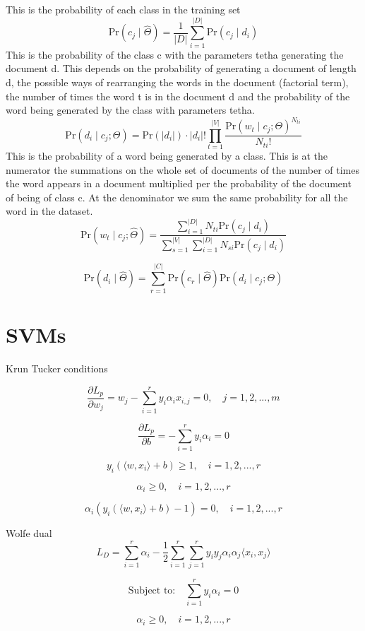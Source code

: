 \documentclass[12pt,oneside,a4paper]{article}
\begin{document}
This is the probability of each class in the training set
\[
    \text{Pr}(c_j \mid \hat{\Theta}) = \frac{1}{|D|} \sum_{i=1}^{|D|} \text{Pr}(c_j \mid d_i)
\]
This is the probability of the class c with the parameters tetha generating the document d. This depends on the probability of generating a document of length d, the possible ways of rearranging the words in the document (factorial term), the number of times the word t is in the document d and the probability of the word being generated by the class with parameters tetha.
\[
    \text{Pr}(d_i \mid c_j; \Theta) = \text{Pr}(|d_i|) \cdot |d_i|! \prod_{t=1}^{|V|} \frac{\text{Pr}(w_t \mid c_j; \Theta)^{N_{ti}}}{N_{ti}!}
\]
This is the probability of a word being generated by a class. This is at the numerator the summations on the whole set of documents of the number of times the word appears in a document multiplied per the probability of the document of being of class c.
At the denominator we sum the same probability for all the word in the dataset.
\[
    \text{Pr}(w_t \mid c_j; \hat{\Theta}) = \frac{\sum_{i=1}^{|D|} N_{ti} \text{Pr}(c_j \mid d_i)}{\sum_{s=1}^{|V|} \sum_{i=1}^{|D|} N_{si} \text{Pr}(c_j \mid d_i)}
\]

\[
    \text{Pr}(d_i \mid \hat{\Theta}) = \sum_{r=1}^{|C|} \text{Pr}(c_r \mid \hat{\Theta}) \text{Pr}(d_i \mid c_j; \Theta)
\]

\section{SVMs}
Krun Tucker conditions

\[
    \frac{\partial L_p}{\partial w_j} = w_j - \sum_{i=1}^{r} y_i \alpha_i x_{i,j} = 0, \quad j = 1, 2, ..., m
\]

\[
    \frac{\partial L_p}{\partial b} = - \sum_{i=1}^{r} y_i \alpha_i = 0
\]

\[
    y_i \left( \langle w, x_i \rangle + b \right) \geq 1, \quad i = 1, 2, ..., r
\]

\[
    \alpha_i \geq 0, \quad i = 1, 2, ..., r
\]

\[
    \alpha_i \left( y_i \left( \langle w, x_i \rangle + b \right) - 1 \right) = 0, \quad i = 1, 2, ..., r
\]

Wolfe dual
\[
    L_D = \sum_{i=1}^{r} \alpha_i - \frac{1}{2} \sum_{i=1}^{r} \sum_{j=1}^{r} y_i y_j \alpha_i \alpha_j \langle x_i, x_j \rangle
\]

\[
    \text{Subject to:} \quad \sum_{i=1}^{r} y_i \alpha_i = 0
\]

\[
    \alpha_i \geq 0, \quad i = 1, 2, ..., r
\]
\end{document}
